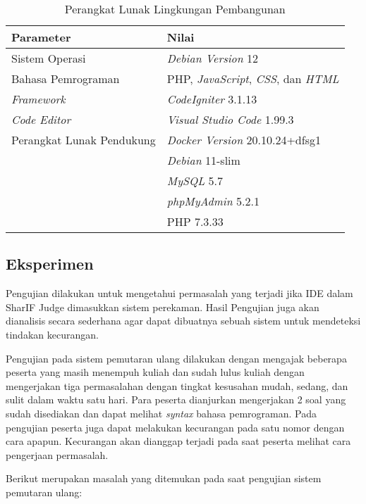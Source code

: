 \begin{table}[H]
    \caption{Perangkat Lunak Lingkungan Pembangunan}
    \label{tab:5:2:1:lunakpembangunan}
    \centering
    \begin{tabular}{|l|l|}
        \hline
        \textbf{Parameter}        & \textbf{Nilai}                                            \\ \hline
        Sistem Operasi            & \textit{Debian Version} 12     \\ \hline
        Bahasa Pemrograman        & PHP, \textit{JavaScript}, \textit{CSS}, dan \textit{HTML} \\ \hline
        \textit{Framework}        & \textit{CodeIgniter} 3.1.13                               \\ \hline
        \textit{Code Editor}      & \textit{Visual Studio Code} 1.99.3                        \\ \hline
        Perangkat Lunak Pendukung & \textit{Docker Version} 20.10.24+dfsg1                            \\ & \textit{Debian} 11-slim \\ & \textit{MySQL} 5.7 \\ & \textit{phpMyAdmin} 5.2.1 \\ & PHP 7.3.33\\ \hline
    \end{tabular}
\end{table}

\subsection{Eksperimen}

Pengujian dilakukan untuk mengetahui permasalah yang terjadi jika IDE dalam SharIF Judge dimasukkan sistem perekaman. Hasil Pengujian juga akan dianalisis secara sederhana agar dapat dibuatnya sebuah sistem untuk mendeteksi tindakan kecurangan.

Pengujian pada sistem pemutaran ulang dilakukan dengan mengajak beberapa peserta yang masih menempuh kuliah dan sudah lulus kuliah dengan mengerjakan tiga permasalahan dengan tingkat kesusahan mudah, sedang, dan sulit dalam waktu satu hari. Para peserta dianjurkan mengerjakan 2 soal yang sudah disediakan dan dapat melihat \textit{syntax} bahasa pemrograman. Pada pengujian peserta juga dapat melakukan kecurangan pada satu nomor dengan cara apapun. Kecurangan akan dianggap terjadi pada saat peserta melihat cara pengerjaan permasalah.

Berikut merupakan masalah yang ditemukan pada saat pengujian sistem pemutaran ulang:

